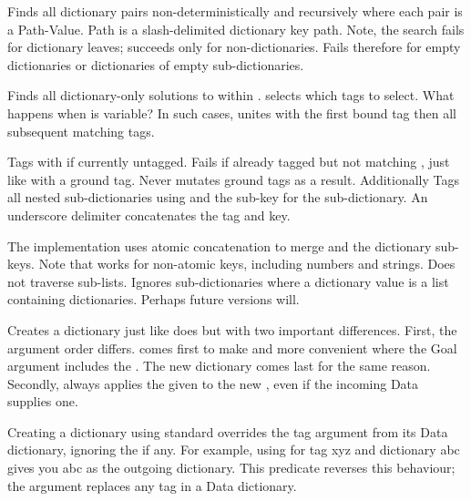\begin{description}
\nodescription
Finds all dictionary pairs non-deterministically and recursively
where each pair is a Path-Value. Path is a slash-delimited
dictionary key path. Note, the search fails for dictionary leaves;
succeeds only for non-dictionaries. Fails therefore for empty
dictionaries or dictionaries of empty sub-dictionaries.

Finds all dictionary-only solutions to  within . 
selects which tags to select. What happens when  is variable? In
such cases, unites with the first bound tag then all subsequent
matching tags.

Tags  with  if currently untagged. Fails if already tagged
but not matching , just like  with a ground tag. Never
mutates ground tags as a result. Additionally Tags all nested
sub-dictionaries using  and the sub-key for the sub-dictionary.
An underscore delimiter concatenates the tag and key.

The implementation uses atomic concatenation to merge  and the
dictionary sub-keys. Note that  works for
non-atomic keys, including numbers and strings. Does not traverse
sub-lists. Ignores sub-dictionaries where a dictionary value is a
list containing dictionaries. Perhaps future versions will.

Creates a dictionary just like  does but with two
important differences. First, the argument order differs.  comes
first to make  and  more convenient where the
Goal argument includes the . The new dictionary  comes last
for the same reason. Secondly, always applies the given  to the
new , even if the incoming Data supplies one.

Creating a dictionary using standard  overrides the tag
argument from its Data dictionary, ignoring the  if any. For
example, using  for tag xyz and dictionary abc\Scurl{} gives
you abc\Scurl{} as the outgoing dictionary. This predicate reverses this
behaviour; the  argument replaces any tag in a Data dictionary.


\end{description}
